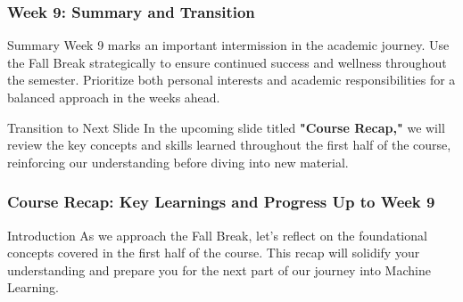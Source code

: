\documentclass[aspectratio=169]{beamer}
\begin{document}
\begin{frame}[fragile]
    \frametitle{Week 9: Summary and Transition}
    \begin{block}{Summary}
        Week 9 marks an important intermission in the academic journey. Use the Fall Break strategically to ensure continued success and wellness throughout the semester. Prioritize both personal interests and academic responsibilities for a balanced approach in the weeks ahead.
    \end{block}
    \begin{block}{Transition to Next Slide}
        In the upcoming slide titled \textbf{"Course Recap,"} we will review the key concepts and skills learned throughout the first half of the course, reinforcing our understanding before diving into new material.
    \end{block}
\end{frame}

\begin{frame}[fragile]
    \frametitle{Course Recap: Key Learnings and Progress Up to Week 9}
    \begin{block}{Introduction}
        As we approach the Fall Break, let’s reflect on the foundational concepts covered in the first half of the course. This recap will solidify your understanding and prepare you for the next part of our journey into Machine Learning.
    \end{block}
\end{frame}
\end{document}
